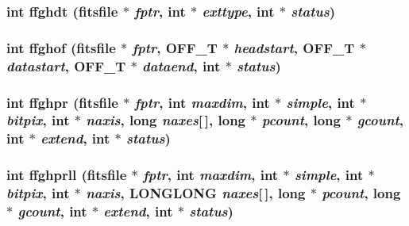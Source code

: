 \subsubsection{\setlength{\rightskip}{0pt plus 5cm}int ffghdt (\bf{fitsfile} $\ast$ {\em fptr}, int $\ast$ {\em exttype}, int $\ast$ {\em status})}\label{test_2roimasker_2fitsio_8h_b6397953ca4869d2d95466d0b69fab90}


\subsubsection{\setlength{\rightskip}{0pt plus 5cm}int ffghof (\bf{fitsfile} $\ast$ {\em fptr}, OFF\_\-T $\ast$ {\em headstart}, OFF\_\-T $\ast$ {\em datastart}, OFF\_\-T $\ast$ {\em dataend}, int $\ast$ {\em status})}\label{test_2roimasker_2fitsio_8h_ce0a6f7eeaab4cc5b53d42a9bcab393b}


\subsubsection{\setlength{\rightskip}{0pt plus 5cm}int ffghpr (\bf{fitsfile} $\ast$ {\em fptr}, int {\em maxdim}, int $\ast$ {\em simple}, int $\ast$ {\em bitpix}, int $\ast$ {\em naxis}, long {\em naxes}[$\,$], long $\ast$ {\em pcount}, long $\ast$ {\em gcount}, int $\ast$ {\em extend}, int $\ast$ {\em status})}\label{test_2roimasker_2fitsio_8h_5eb7c7db8772313ff2612637ef1a1bf3}


\subsubsection{\setlength{\rightskip}{0pt plus 5cm}int ffghprll (\bf{fitsfile} $\ast$ {\em fptr}, int {\em maxdim}, int $\ast$ {\em simple}, int $\ast$ {\em bitpix}, int $\ast$ {\em naxis}, \bf{LONGLONG} {\em naxes}[$\,$], long $\ast$ {\em pcount}, long $\ast$ {\em gcount}, int $\ast$ {\em extend}, int $\ast$ {\em status})}\label{test_2roimasker_2fitsio_8h_0d54065b1609c1b7edcbe08454996773}


